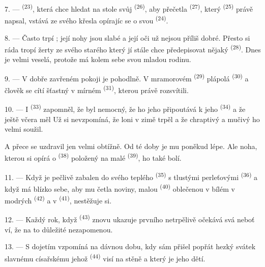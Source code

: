 7. ---  \textsuperscript{(23)}, která chce hledat na stole svůj
 \textsuperscript{(26)}, aby přečetla 
\textsuperscript{(27)}, který  \textsuperscript{(25)} právě napsal,
vstává ze svého křesla opírajíc se o svou  \textsuperscript{(24)}.

8. --- Často trpí ; její nohy
jsou slabé a její oči už nejsou příliš dobré. Přesto si ráda tropí žerty ze svého
starého  který jí stále chce předepisovat nějaký 
\textsuperscript{(28)}. Dnes je velmi veselá, protože má kolem sebe svou mladou
rodinu.

9. --- V dobře zavřeném pokoji je pohodlně. V mramorovém 
\textsuperscript{(29)} plápolá  \textsuperscript{(30)} a člověk
se cítí šťastný v mírném   \textsuperscript{(31)}, kterou
právě rozsvítili.

\VUsaut{4.2mm}
\VUsaut{3.0mm}

10. --- I  \textsuperscript{(33)} zapomněl, že byl nemocný, že ho jeho
 připoutává k jeho  \textsuperscript{(34)} a že
ještě včera měl  Už si nevzpomíná, že loni v zimě trpěl
 a že chraptivý a mučivý  ho velmi soužil.

A přece se uzdravil jen velmi obtížně. Od té doby je mu poněkud lépe. Ale noha, kterou
si opírá o  \textsuperscript{(38)} položený na malé 
\textsuperscript{(39)}, ho také bolí.

11. --- Když je pečlivě zabalen do svého teplého 
\textsuperscript{(35)} s tlustými perleťovými  \textsuperscript{(36)}
a když má blízko sebe, aby mu četla noviny, malou 
\textsuperscript{(40)} oblečenou v bílém  v modrých 
\textsuperscript{(42)} a v  \textsuperscript{(41)}, nestěžuje si.

12. --- Každý rok, když  \textsuperscript{(43)} znovu ukazuje
 prvního  netrpělivě očekává svá 
neboť ví, že na to důležité  nezapomenou.

13. --- S dojetím vzpomíná na dávnou dobu, kdy sám přišel popřát hezký svátek
slavnému císařskému  jehož 
\textsuperscript{(44)} visí na stěně a který je  jeho dětí.
